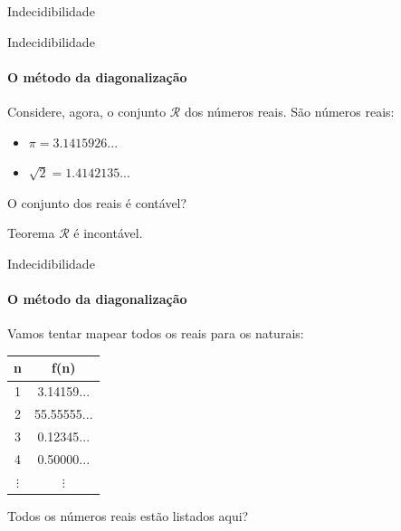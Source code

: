 \documentclass{beamer}
\begin{document}
\begin{frame}{Indecidibilidade}
\begin{figure}
	\end{figure}
\end{frame}
\begin{frame}{Indecidibilidade}
	\framesubtitle{O método da diagonalização}
	Considere, agora, o conjunto $\mathscr{R}$ dos números reais. São números reais:
	\begin{itemize}
		\item $\pi = 3.1415926...$
		\item $\sqrt{2} = 1.4142135...$
	\end{itemize}
	O conjunto dos reais é contável?
	\begin{block}{Teorema}
		$\mathscr{R}$ é incontável.
	\end{block}
\end{frame}
\begin{frame}{Indecidibilidade}
	\framesubtitle{O método da diagonalização}
	Vamos tentar mapear todos os reais para os naturais:
	\begin{table}[!b]
	{\carlitoTLF
		\begin{tabular}{cc}
			\textbf{n} & \textbf{f(n)} \\
			\toprule
			1 & 3.14159... \\
			2 & 55.55555... \\
			3 & 0.12345... \\
			4 & 0.50000... \\
			$\vdots$ & $\vdots$ \\
			\bottomrule
		\end{tabular}}
	\end{table}
	Todos os números reais estão listados aqui?
\end{frame}
\end{document}
